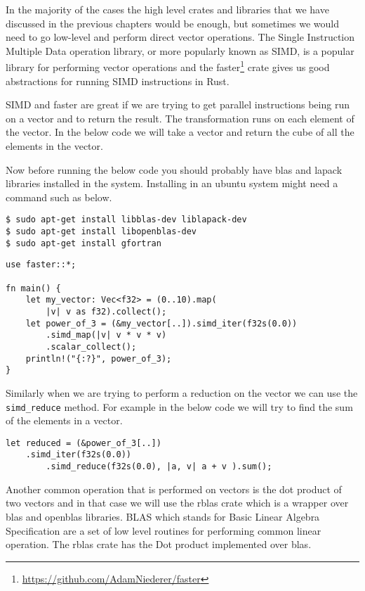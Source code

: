 \documentclass{book}
\begin{document}
In the majority of the cases the high level crates and libraries that we have discussed in the previous chapters would be enough, but sometimes we would need to go low-level and perform direct vector operations. The Single Instruction  Multiple Data operation library, or more popularly known as SIMD, is a popular library for performing vector operations and the faster\footnote{\href{}{https://github.com/AdamNiederer/faster}} crate gives us good abstractions for running SIMD instructions in Rust.

SIMD and faster are great if we are trying to get parallel instructions being run on a vector and to return the result. The transformation runs on each element of the vector. In the below code we will take a vector and return the cube of all the elements in the vector.

Now before running the below code you should probably have blas and lapack libraries installed in the system. Installing in an ubuntu system might need a command such as below.

\begin{lstlisting}[caption={chapter7/high-performance-computing/src/main.rs}, basicstyle=\small]
$ sudo apt-get install libblas-dev liblapack-dev
$ sudo apt-get install libopenblas-dev
$ sudo apt-get install gfortran
\end{lstlisting}

\begin{lstlisting}[caption={chapter7/high-performance-computing/src/main.rs}, basicstyle=\small]
use faster::*;

fn main() {
    let my_vector: Vec<f32> = (0..10).map(
    	|v| v as f32).collect();
    let power_of_3 = (&my_vector[..]).simd_iter(f32s(0.0))
        .simd_map(|v| v * v * v)
        .scalar_collect();
    println!("{:?}", power_of_3);
}
\end{lstlisting}

Similarly when we are trying to perform a reduction on the vector we can use the \lstinline{simd_reduce} method. For example in the below code we will try to find the sum of the elements in a vector.

\begin{lstlisting}[caption={chapter7/high-performance-computing/src/main.rs}, basicstyle=\small]
let reduced = (&power_of_3[..])
	.simd_iter(f32s(0.0))
        .simd_reduce(f32s(0.0), |a, v| a + v ).sum();
\end{lstlisting}

Another common operation that is performed on vectors is the dot product of two vectors and in that case we will use the rblas crate which is a wrapper over blas and openblas libraries. BLAS which stands for Basic Linear Algebra Specification are a set of low level routines for performing common linear operation. The rblas crate has the Dot product implemented over blas\cite{OT:4}.
\end{document}
